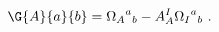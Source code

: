 \begin{equation} \label{gamma}
  \G{A}{a}{b} = {\Omega_A}^a{}_b - A^I_A {\Omega_I}^a{}_b\ .
 \end{equation}


